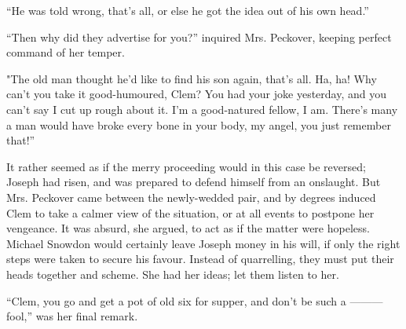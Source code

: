 ``He was told wrong, that's all, or else he got the idea out of his own
head.''

``Then why did they advertise for you?'' inquired Mrs. Peckover, keeping
perfect command of her temper.

"The old man thought he'd like to find {\protect\hypertarget{97}{}{}}his
son again, that's all. Ha, ha! Why can't you take it good-humoured,
Clem? You had your joke yesterday, and you can't say I cut up rough
about it. I'm a good-natured fellow, I am. There's many a man would have
broke every bone in your body, my angel, you just remember that!''

It rather seemed as if the merry proceeding would in this case be
reversed; Joseph had risen, and was prepared to defend himself from an
onslaught. But Mrs. Peckover came between the newly-wedded pair, and by
degrees induced Clem to take a calmer view of the situation, or at all
events to postpone her vengeance. It was absurd, she argued, to act as
if the matter were hopeless. Michael Snowdon would certainly leave
Joseph money in his will, if only the right steps were taken to secure
his favour. Instead of quarrelling, they must put their heads together
and scheme. She had her ideas; let them listen to her.

``Clem, you go and get a pot of old six for supper, and don't be such a
{{---------}} fool,'' was her final remark.
